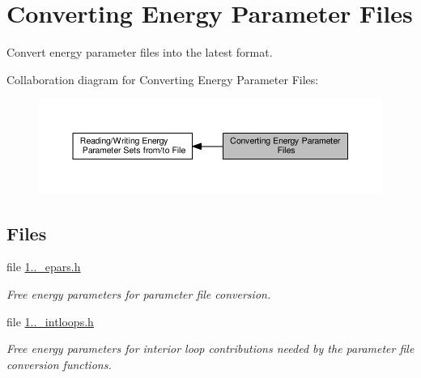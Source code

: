 \hypertarget{group__energy__parameters__convert}{}\section{Converting Energy Parameter Files}
\label{group__energy__parameters__convert}


Convert energy parameter files into the latest format.  


Collaboration diagram for Converting Energy Parameter Files\+:
\nopagebreak
\begin{figure}[H]
\begin{center}
\leavevmode
\includegraphics[width=350pt]{group__energy__parameters__convert}
\end{center}
\end{figure}
\subsection*{Files}
\begin{DoxyCompactItemize}
\item 
file \hyperlink{1_88_84__epars_8h}{1..\+\_\+epars.\+h}
\begin{DoxyCompactList}\small\item\em Free energy parameters for parameter file conversion. \end{DoxyCompactList}\item 
file \hyperlink{1_88_84__intloops_8h}{1..\+\_\+intloops.\+h}
\begin{DoxyCompactList}\small\item\em Free energy parameters for interior loop contributions needed by the parameter file conversion functions. \end{DoxyCompactList}\end{DoxyCompactItemize}
